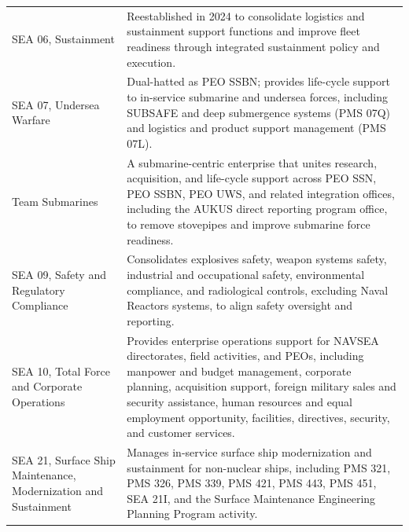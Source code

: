 \documentclass[../main.tex]{subfiles}
\begin{document}
\begin{tabularx}{\textwidth}{@{} >{\RaggedRight\arraybackslash}p{} >{\RaggedRight\arraybackslash}X @{}}
  SEA 06, Sustainment & Reestablished in 2024 to consolidate logistics and sustainment support functions and improve fleet readiness through integrated sustainment policy and execution. \\
  SEA 07, Undersea Warfare & Dual-hatted as PEO SSBN; provides life-cycle support to in-service submarine and undersea forces, including SUBSAFE and deep submergence systems (PMS 07Q) and logistics and product support management (PMS 07L). \\
  Team Submarines & A submarine-centric enterprise that unites research, acquisition, and life-cycle support across PEO SSN, PEO SSBN, PEO UWS, and related integration offices, including the AUKUS direct reporting program office, to remove stovepipes and improve submarine force readiness. \\
  SEA 09, Safety and Regulatory Compliance & Consolidates explosives safety, weapon systems safety, industrial and occupational safety, environmental compliance, and radiological controls, excluding Naval Reactors systems, to align safety oversight and reporting. \\
  SEA 10, Total Force and Corporate Operations & Provides enterprise operations support for NAVSEA directorates, field activities, and PEOs, including manpower and budget management, corporate planning, acquisition support, foreign military sales and security assistance, human resources and equal employment opportunity, facilities, directives, security, and customer services. \\
  SEA 21, Surface Ship Maintenance, Modernization and Sustainment & Manages in-service surface ship modernization and sustainment for non-nuclear ships, including PMS 321, PMS 326, PMS 339, PMS 421, PMS 443, PMS 451, SEA 21I, and the Surface Maintenance Engineering Planning Program activity. \\
  \bottomrule
\end{tabularx}
\end{document}
